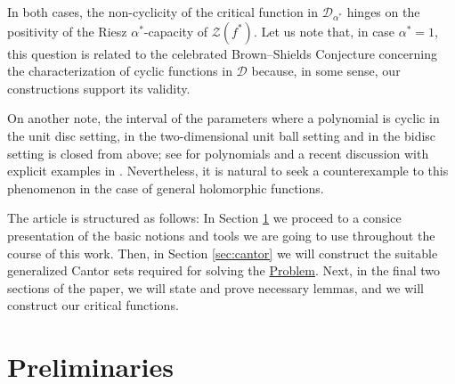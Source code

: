 \documentclass[12pt]{amsart}
\theoremstyle{definition}\newtheorem{remark}[theorem]{Remark}
\theoremstyle{definition}\newtheorem{example}[theorem]{Example}
\theoremstyle{definition}\newtheorem{definition}{Definition}
\numberwithin{equation}{section}
\newcommand\cD{{\mathcal D}}
\begin{document}
In both cases, the non-cyclicity of the critical function in $\cD_{\alpha^*}$ hinges on the positivity of the Riesz $\alpha^*$-capacity of $\mathcal{Z}(f^*)$. Let us note that, in case $\alpha^*=1$, this question is related to the celebrated Brown--Shields Conjecture \cite[Question 12]{Brown-Shields} concerning the characterization of cyclic functions in $\cD$ because, in some sense, our constructions support its validity.

On another note, the interval of the parameters where a polynomial is cyclic in the unit disc setting, in the two-dimensional unit ball setting and in the bidisc setting is closed from above; see \cite{Kosinski-Sola1,Bergvist,Brown-Shields,Kosinski-Sola2, Vavitsas1, Vavitsas2} for polynomials and a recent discussion with explicit examples in \cite{Pouriya}. Nevertheless, it is natural to seek a counterexample to this phenomenon in the case of general holomorphic functions.

The article is structured as follows: In Section \ref{sec:preliminaries} we proceed to a consice presentation of the basic notions and tools we are going to use throughout the course of this work. Then, in Section \ref{sec:cantor} we will construct the suitable generalized Cantor sets required for solving the \hyperref[Problem]{Problem}. Next, in the final two sections of the paper, we will state and prove necessary lemmas, and we will construct our critical functions.

\section{Preliminaries}\label{sec:preliminaries}
\end{document}
